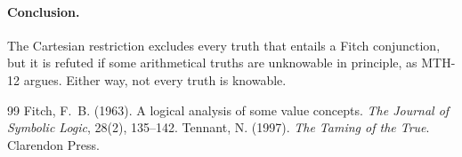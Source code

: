 \documentclass{situationist-preprint}
\begin{document}
\paragraph{Conclusion.} The Cartesian restriction excludes every truth that entails a Fitch conjunction, but it is refuted if some arithmetical truths are unknowable in principle, as MTH-12 argues. Either way, not every truth is knowable.

\begin{thebibliography}{99}\small
{} Fitch, F.~B. (1963). A logical analysis of some value concepts. \emph{The Journal of Symbolic Logic}, 28(2), 135--142.
 Tennant, N. (1997). \emph{The Taming of the True}. Clarendon Press.
\end{thebibliography}
\end{document}
